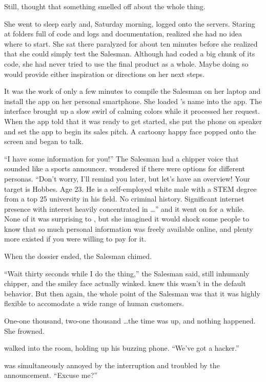 Still, {\protag} thought that something smelled off about the whole thing.

She went to sleep early and, Saturday morning, logged onto the servers. Staring at folders full of code and logs and documentation, {\protag} realized she had no idea where to start.  She sat there paralyzed for about ten minutes before she realized that she could simply test the Salesman. Although {\protag} had coded a big chunk of its code, she had never tried to use the final product as a whole. Maybe doing so would provide either inspiration or directions on her next steps.

It was the work of only a few minutes to compile the Salesman on her laptop and install the app on her personal smartphone. She loaded {\sidetag}'s name into the app. The interface brought up a slow swirl of calming colors while it processed her request. When the app told {\protag} that it was ready to get started, she put the phone on speaker and set the app to begin its sales pitch. A cartoony happy face popped onto the screen and began to talk.

``I have some information for you!'' The Salesman had a chipper voice that sounded like a sports announcer. {\protag} wondered if there were options for different personas. ``Don't worry, I'll remind you later, but let's have an overview! Your target is {\sidetag} Hobbes. Age 23. He is a self-employed white male with a STEM degree from a top 25 university in his field. No criminal history. Significant internet presence with interest heavily concentrated in \dots'' and it went on for a while. None of it was surprising to {\protag}, but she imagined it would shock some people to know that so much personal information was freely available online, and plenty more existed if you were willing to pay for it.

When the dossier ended, the Salesman chimed.

``Wait thirty seconds while I do the thing,'' the Salesman said, still inhumanly chipper, and the smiley face actually winked. {\protag} knew this wasn't in the default behavior. But then again, the whole point of the Salesman was that it was highly flexible to accomodate a wide range of human customers.

One-one thousand, two-one thousand \dots the time was up, and nothing happened. She frowned. 

{\sidetag} walked into the room, holding up his buzzing phone. ``We've got a hacker.''

{\protag} was simultaneously annoyed by the interruption and troubled by the announcement. ``Excuse me?''

